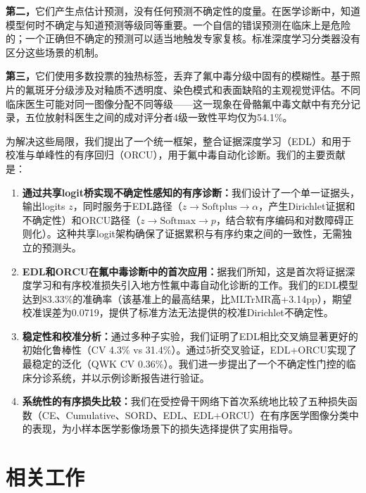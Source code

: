 \documentclass[12pt,a4paper]{ctexart}
\begin{document}
\textbf{第二，}它们产生点估计预测，没有任何预测不确定性的度量。在医学诊断中，知道模型何时不确定与知道预测等级同等重要。一个自信的错误预测在临床上是危险的；一个正确但不确定的预测可以适当地触发专家复核。标准深度学习分类器没有区分这些场景的机制。

\textbf{第三，}它们使用多数投票的独热标签，丢弃了氟中毒分级中固有的模糊性。基于照片的氟斑牙分级涉及对釉质不透明度、染色模式和表面缺陷的主观视觉评估。不同临床医生可能对同一图像分配不同等级——这一现象在骨骼氟中毒文献中有充分记录，五位放射科医生之间的成对评分者4级一致性平均仅为54.1\%\cite{xu2025mwinc}。

为解决这些局限，我们提出了一个统一框架，整合证据深度学习（EDL）\cite{sensoy2018edl}和用于校准与单峰性的有序回归（ORCU）\cite{kim2025orcu}，用于氟中毒自动化诊断。我们的主要贡献是：

\begin{enumerate}[leftmargin=*]
    \item \textbf{通过共享logit桥实现不确定性感知的有序诊断：}我们设计了一个单一证据头，输出logits $z$，同时服务于EDL路径（$z \to \mathrm{Softplus} \to \alpha$，产生Dirichlet证据和不确定性）和ORCU路径（$z \to \mathrm{Softmax} \to p$，结合软有序编码和对数障碍正则化）。这种共享logit架构确保了证据累积与有序约束之间的一致性，无需独立的预测头。

    \item \textbf{EDL和ORCU在氟中毒诊断中的首次应用：}据我们所知，这是首次将证据深度学习和有序校准损失引入地方性氟中毒自动化诊断的工作。我们的EDL模型达到83.33\%的准确率（该基准上的最高结果，比MLTrMR高+3.14pp），期望校准误差为0.0719，提供了标准方法无法提供的校准Dirichlet不确定性。

    \item \textbf{稳定性和校准分析：}通过多种子实验，我们证明了EDL相比交叉熵显著更好的初始化鲁棒性（CV 4.3\% vs 31.4\%）。通过5折交叉验证，EDL+ORCU实现了最稳定的泛化（QWK CV 0.36\%）。我们进一步提出了一个不确定性门控的临床分诊系统，并以示例诊断报告进行验证。

    \item \textbf{系统性的有序损失比较：}我们在受控骨干网络下首次系统地比较了五种损失函数（CE、Cumulative、SORD、EDL、EDL+ORCU）在有序医学图像分类中的表现，为小样本医学影像场景下的损失选择提供了实用指导。
\end{enumerate}

\section{相关工作}
\end{document}
